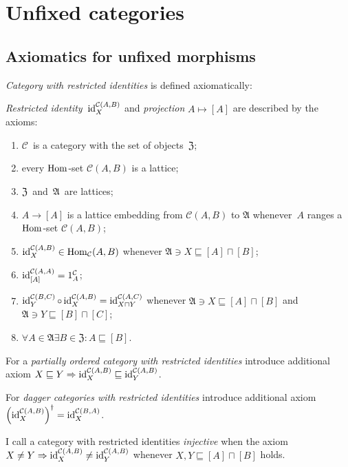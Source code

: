 \chapter{Unfixed categories}


\section{Axiomatics for unfixed morphisms}

\begin{defn}
\label{unf-mor}
\emph{Category with restricted identities} is defined
axiomatically:

\emph{Restricted identity}~$\operatorname{id}^{\mathcal{C}(A,B)}_X$
and \emph{projection} $A\mapsto[A]$ are
described by the axioms:
\begin{enumerate}
\item $\mathcal{C}$~is a category with the set of
objects~$\mathfrak{Z}$;
\item every $\operatorname{Hom}$-set $\mathcal{C}(A,B)$ is a lattice;
\item $\mathfrak{Z}$~and~$\mathfrak{A}$~are lattices;
\item $A\to[A]$ is a lattice embedding
from $\mathcal{C}(A,B)$ to $\mathfrak{A}$ whenever~$A$
ranges a $\operatorname{Hom}$-set $\mathcal{C}(A,B)$;
\item $\operatorname{id}^{\mathcal{C}(A,B)}_X\in\operatorname{Hom}_{\mathcal{C}}(A,B)$
whenever $\mathfrak{A}\ni X\sqsubseteq [A]\sqcap[B]$;
\item $\operatorname{id}^{\mathcal{C}(A,A)}_{[A]} = 1^{\mathcal{C}}_A$;
\item $\operatorname{id}^{\mathcal{C}(B,C)}_Y \circ \operatorname{id}^{\mathcal{C}(A,B)}_X = \operatorname{id}^{\mathcal{C}(A,C)}_{X\sqcap Y}$
whenever $\mathfrak{A}\ni X\sqsubseteq [A]\sqcap[B]$
and $\mathfrak{A}\ni Y\sqsubseteq [B]\sqcap[C]$;
\item $\forall A\in\mathfrak{A}\exists B\in\mathfrak{Z}:
A\sqsubseteq[B]$.
\end{enumerate}

For a \emph{partially ordered category with restricted identities} introduce additional axiom $X\sqsubseteq Y\Rightarrow
\operatorname{id}^{\mathcal{C}(A,B)}_X\sqsubseteq\operatorname{id}^{\mathcal{C}(A,B)}_Y$.

For \emph{dagger categories with restricted identities} introduce additional axiom
$\left(\operatorname{id}^{\mathcal{C}(A,B)}_X\right)^\dagger =
\operatorname{id}^{\mathcal{C}(B,A)}_X$.
\end{defn}

\begin{defn}
I call a category with restricted identities
\emph{injective} when the axiom $X\ne Y\Rightarrow
\operatorname{id}^{\mathcal{C}(A,B)}_X\ne\operatorname{id}^{\mathcal{C}(A,B)}_Y$
whenever $X,Y\sqsubseteq[A]\sqcap[B]$ holds.
\end{defn}

